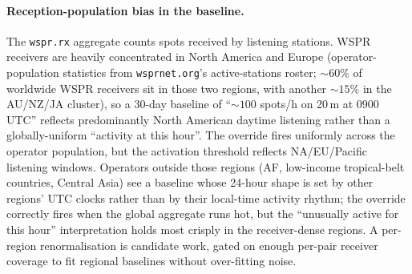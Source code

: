 \documentclass[11pt,a4paper]{article}
\begin{document}
\paragraph{Reception-population bias in the baseline.}  The
\texttt{wspr.rx} aggregate counts spots received by listening
stations.  WSPR receivers are heavily concentrated in North America
and Europe (operator-population statistics from
\texttt{wsprnet.org}'s active-stations roster; ${\sim}60\%$ of
worldwide WSPR receivers sit in those two regions, with another
${\sim}15\%$ in the AU/NZ/JA cluster), so a 30-day baseline of
``${\sim}100$ spots/h on 20\,m at 0900\,UTC'' reflects predominantly
North American daytime listening rather than a globally-uniform
``activity at this hour''.  The override fires uniformly across the
operator population, but the activation threshold reflects
NA/EU/Pacific listening windows.  Operators outside those regions
(AF, low-income tropical-belt countries, Central Asia) see a
baseline whose 24-hour shape is set by other regions' UTC clocks
rather than by their local-time activity rhythm; the override
correctly fires when the global aggregate runs hot, but the
``unusually active for this hour'' interpretation holds most
crisply in the receiver-dense regions.  A per-region renormalisation
is candidate work, gated on enough per-pair receiver coverage to
fit regional baselines without over-fitting noise.

\end{document}
